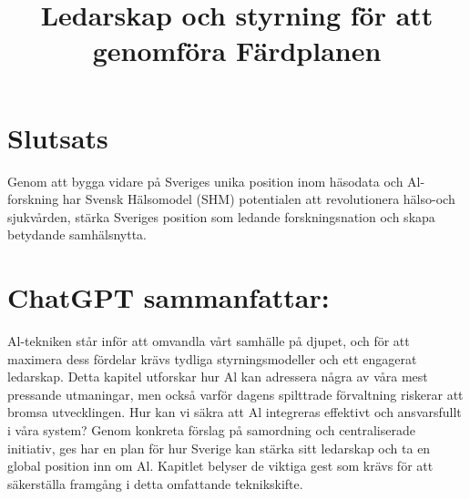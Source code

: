 {\section*{Slutsats}
Genom att bygga vidare på Sveriges unika position inom häsodata och Al-forskning har Svensk Hälsomodel (SHM) potentialen att revolutionera hälso-och sjukvården, stärka Sveriges position som ledande forskningsnation och skapa betydande samhälsnytta.

\title{
Ledarskap och styrning för att genomföra Färdplanen
}
\section*{ChatGPT sammanfattar:}
Al-tekniken står inför att omvandla vårt samhälle på djupet, och för att maximera dess fördelar krävs tydliga styrningsmodeller och ett engagerat ledarskap.
Detta kapitel utforskar hur \(\mathrm{Al}\) kan adressera några av våra mest pressande utmaningar, men också varför dagens spilttrade förvaltning riskerar att bromsa utvecklingen. Hur kan vi säkra att Al integreras effektivt och ansvarsfullt i våra system? Genom konkreta förslag på samordning och centraliserade initiativ, ges har en plan för hur Sverige kan stärka sitt ledarskap och ta en global position inn om Al. Kapitlet belyser de viktiga gest som krävs för att säkerställa framgång i detta omfattande teknikskifte.
}
